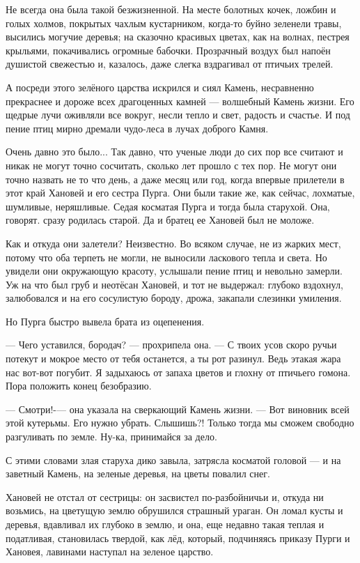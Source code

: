 \documentclass[12pt, a4paper, openany]{book}
\begin{document}
	Не всегда она была такой безжизненной. На месте болотных кочек, ложбин и голых холмов, покрытых чахлым кустарником, когда-то буйно зеленели травы, высились могучие деревья; на сказочно красивых цветах, как на волнах, пестрея крыльями, покачивались огромные бабочки. Прозрачный воздух был напоён душистой свежестью и, казалось, даже слегка вздрагивал от птичьих трелей.
	
	А посреди этого зелёного царства искрился и сиял Камень, несравненно прекраснее и дороже всех драгоценных камней — волшебный Камень жизни. Его щедрые лучи оживляли все вокруг, несли тепло и свет, радость и счастье. И под пение птиц мирно дремали чудо-леса в лучах доброго Камня.
	
	Очень давно это было... Так давно, что ученые люди до сих пор все считают и никак не могут точно сосчитать, сколько лет прошло с тех пор. Не могут они точно назвать не то что день, а даже месяц или год, когда впервые прилетели в этот край Хановей и его сестра Пурга. Они были такие же, как сейчас, лохматые, шумливые, неряшливые. Седая косматая Пурга и тогда была старухой. Она, говорят. сразу родилась старой. Да и братец ее Хановей был не моложе.
	
	Как и откуда они залетели? Неизвестно. Во всяком случае, не из жарких мест, потому что оба терпеть не могли, не выносили ласкового тепла и света. Но увидели они окружающую красоту, услышали пение птиц и невольно замерли. Уж на что был груб и неотёсан Хановей, и тот не выдержал: глубоко вздохнул, залюбовался и на его сосулистую бороду, дрожа, закапали слезинки умиления.
	
	Но Пурга быстро вывела брата из оцепенения.
	
	— Чего уставился, бородач? — прохрипела она. — С твоих усов скоро ручьи потекут и мокрое место от тебя останется, а ты рот разинул. Ведь этакая жара нас вот-вот погубит. Я задыхаюсь от запаха цветов и глохну от птичьего гомона. Пора положить конец безобразию.
	
	— Смотри!-— она указала на сверкающий Камень жизни. — Вот виновник всей этой кутерьмы. Его нужно убрать. Слышишь?! Только тогда мы сможем свободно разгуливать по земле. Ну-ка, принимайся за дело.
	
	С этими словами злая старуха дико завыла, затрясла косматой головой — и на заветный Камень, на зеленые деревья, на цветы повалил снег.
	
	Хановей не отстал от сестрицы: он засвистел по-разбойничьи и, откуда ни возьмись, на цветущую землю обрушился страшный ураган. Он ломал кусты и деревья, вдавливал их глубоко в землю, и она, еще недавно такая теплая и податливая, становилась твердой, как лёд, который, подчиняясь приказу Пурги и Хановея, лавинами наступал на зеленое царство.
	
\end{document}
